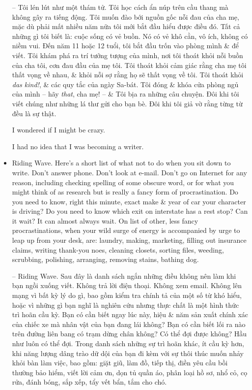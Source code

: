 \documentclass{article}
\begin{document}
\begin{itemize}
	-- Tôi lén lút như một thám tử. Tôi học cách ẩn núp trên cầu thang mà không gây ra tiếng động. Tôi muốn đào bới nguồn gốc nỗi đau của cha mẹ, mặc dù phải mất nhiều năm nữa tôi mới bắt đầu hiểu được điều đó. Tất cả những gì tôi biết là: cuộc sống có vẻ buồn. Nó có vẻ khô cằn, vô ích, không có niềm vui. Đến năm 11 hoặc 12 tuổi, tôi bắt đầu trốn vào phòng mình \& để viết. Tôi khám phá ra trí tưởng tượng của mình, nơi tôi thoát khỏi nỗi buồn của cha tôi, cơn đau đầu của mẹ tôi. Tôi thoát khỏi cảm giác rằng cha mẹ tôi thất vọng về nhau, \& khỏi nỗi sợ rằng họ sẽ thất vọng về tôi. Tôi thoát khỏi {\it das kind!}, \& các quy tắc của ngày Sa-bát. Tôi đóng \& khóa cửa phòng ngủ của mình -- hãy {\it that}, cha mẹ! -- \& Tôi bịa ra những câu chuyện. Đôi khi tôi viết chúng như những lá thư gửi cho bạn bè. Đôi khi tôi giả vờ rằng từng từ đều là sự thật.
	
	I wondered if I might be crazy.
	
	I had no idea that I was becoming a writer.
	\item {\sf Riding Wave.} Here's a short list of what not to do when you sit down to write. Don't answer phone. Don't look at e-mail. Don't go on Internet for any reason, including checking spelling of some obscure word, or for what you might think of as research but is really a fancy form of procrastination. Do you need to know, right this minute, exact make \& year of car your character is driving? Do you need to know which exit on interstate has a rest stop? Can it wait? It can almost always wait. On list of other, less fancy procrastinations, when your wild surge of energy is accompanied by urge to leap up from your desk, are: laundry, making, marketing, filling out insurance claims, writing thank-you noes, cleaning closets, sorting files, weeding, scrubbing, polishing, arranging, removing stains, bathing dog.
	
	-- {\sf Riding Wave.} Sau đây là danh sách ngắn những điều không nên làm khi bạn ngồi xuống viết. Không trả lời điện thoại. Không xem email. Không lên mạng vì bất kỳ lý do gì, bao gồm kiểm tra chính tả của một số từ khó hiểu, hoặc vì những gì bạn nghĩ là nghiên cứu nhưng thực chất là một hình thức trì hoãn cầu kỳ. Bạn có cần biết ngay lúc này, hiệu \& năm sản xuất chính xác của chiếc xe mà nhân vật của bạn đang lái không? Bạn có cần biết lối ra nào trên đường liên bang có trạm dừng chân không? Có thể đợi được không? Hầu như luôn có thể đợi. Trong danh sách những sự trì hoãn khác, ít cầu kỳ hơn, khi năng lượng dâng trào dữ dội của bạn đi kèm với sự thôi thúc muốn nhảy khỏi bàn làm việc, bao gồm: giặt giũ, làm đồ, tiếp thị, điền yêu cầu bồi thường bảo hiểm, viết lời cảm ơn, dọn tủ quần áo, phân loại hồ sơ, nhổ cỏ, cọ rửa, đánh bóng, sắp xếp, tẩy vết bẩn, tắm cho chó.
	

\end{itemize}
\end{document}

